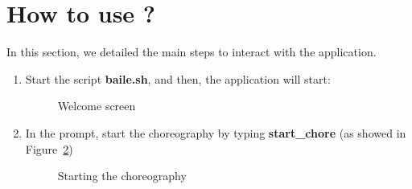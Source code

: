 \documentclass{article}	%
\begin{document}
\section{ How to use ? }
In this section, we detailed the main steps to interact with the application.

\begin{enumerate}
 \item Start the script \textbf{baile.sh}, and then, the application will start:

  \begin{figure}[htbp]
  \centering
  \setlength\fboxrule{1.0pt}
  \caption{Welcome screen}
  \label{welcome-screen}
  \end{figure}

  \item  In the prompt, start the choreography by typing \textbf{start\_chore} (as showed in Figure~\ref{chore})
  
  \begin{figure}[htbp]
  \centering
  \setlength\fboxrule{1.0pt}
  \caption{Starting the choreography}
  \label{chore}
  \end{figure}


\end{enumerate}
\end{document}
